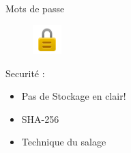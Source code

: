 \begin{frame}{Mots de passe}
\begin{figure}[h!]
  \includegraphics[width=0.10\textwidth]{images/website_-_padlock-512}
\end{figure}
  Securité : 
  \begin{itemize}
  \item Pas de Stockage en clair!
  \item SHA-256
  \item Technique du salage
  \end{itemize}
\end{frame}